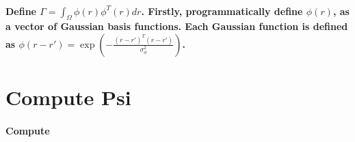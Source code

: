 \documentclass[a4paper, 8pt, english]{article}
\begin{document}
\paragraph{Define $\Gamma=\int_{\Omega}\phi(r)\phi^{T}(r)dr$. Firstly, programmatically
define $\phi(r)$, as a vector of Gaussian basis functions. Each Gaussian
function is defined as $\phi(r-r')=\exp{(-\frac{(r-r')^{T}(r-r')}{\sigma_{\phi}^{2}})}$.}

\section{Compute Psi}
\label{compute psi}
\paragraph{Compute}
\label{par:Compute}
\end{document}
